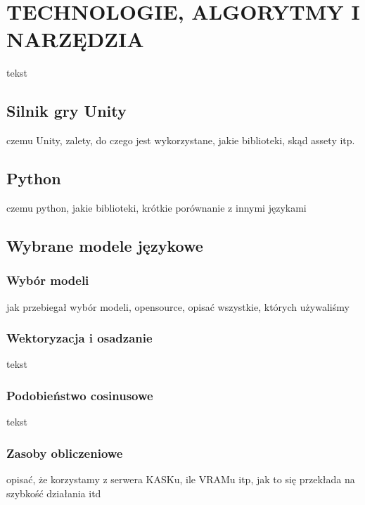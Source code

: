 \chapter{TECHNOLOGIE, ALGORYTMY I NARZĘDZIA}

tekst

\section{Silnik gry Unity}

czemu Unity, zalety, do czego jest wykorzystane, jakie biblioteki, skąd assety itp.

\section{Python}

czemu python, jakie biblioteki, krótkie porównanie z innymi językami

\section{Wybrane modele językowe}

\subsection{Wybór modeli}

jak przebiegał wybór modeli, opensource, opisać wszystkie, których używaliśmy

\subsection{Wektoryzacja i osadzanie}

tekst

\subsection{Podobieństwo cosinusowe}

tekst

\subsection{Zasoby obliczeniowe}

opisać, że korzystamy z serwera KASKu, ile VRAMu itp, jak to się przekłada na szybkość działania itd